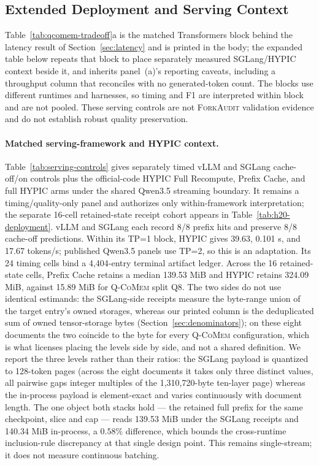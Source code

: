 \documentclass{article}
\newcommand{\qcomem}{\textsc{Q-CoMem}}
\newcommand{\method}{\textsc{ForkAudit}}
\begin{document}
\subsection{Extended Deployment and Serving Context}
\label{app:illustrative-store}

Table~\ref{tab:qcomem-tradeoff}a is the matched Transformers block behind the
latency result of Section~\ref{sec:latency} and is printed in the body; the
expanded table below repeats that block to place separately measured
SGLang/HYPIC context beside it, and inherits panel~(a)'s reporting caveats,
including a throughput column that reconciles with no generated-token count.
The blocks use different runtimes and harnesses, so timing and F1 are
interpreted within block and are not pooled.  These serving controls are not
\method{} validation evidence and do not establish robust quality preservation.



\paragraph{Matched serving-framework and HYPIC context.}
Table~\ref{tab:serving-controls} gives separately timed vLLM and SGLang
cache-off/on controls plus the official-code HYPIC Full Recompute, Prefix
Cache, and full HYPIC arms under the shared Qwen3.5 streaming boundary.  It
remains a timing/quality-only panel and authorizes only within-framework
interpretation; the separate 16-cell retained-state receipt cohort appears in
Table~\ref{tab:h20-deployment}.
vLLM and SGLang each record 8/8 prefix hits and preserve 8/8 cache-off
predictions.  Within its TP=1 block, HYPIC gives 39.63, 0.101 s, and 17.67
tokens/s; published Qwen3.5 panels use TP=2, so this is an adaptation.  Its 24
timing cells bind a 4,404-entry terminal artifact ledger.  Across the
16 retained-state cells, Prefix Cache retains a median 139.53 MiB and HYPIC
retains 324.09 MiB, against 15.89 MiB for \qcomem{} split Q8.  The two sides do
not use identical estimands: the SGLang-side receipts measure the byte-range
union of the target entry's owned storages, whereas our printed column is the
deduplicated sum of owned tensor-storage bytes
(Section~\ref{sec:denominators}); on these eight documents the two coincide to
the byte for every \qcomem{} configuration, which is what licenses placing the
levels side by side, and not a shared definition.  We report the three levels
rather than their ratios: the SGLang payload is quantized to 128-token pages (across the eight
documents it takes only three distinct values, all pairwise gaps integer
multiples of the 1,310,720-byte ten-layer page) whereas the in-process payload
is element-exact and varies continuously with document length.  The one object
both stacks hold --- the retained full prefix for the same checkpoint, slice
and cap --- reads 139.53 MiB under the SGLang receipts and 140.34 MiB
in-process, a $0.58\%$ difference, which bounds the cross-runtime
inclusion-rule discrepancy at that single design point.  This remains
single-stream; it does not measure continuous batching.

\end{document}
